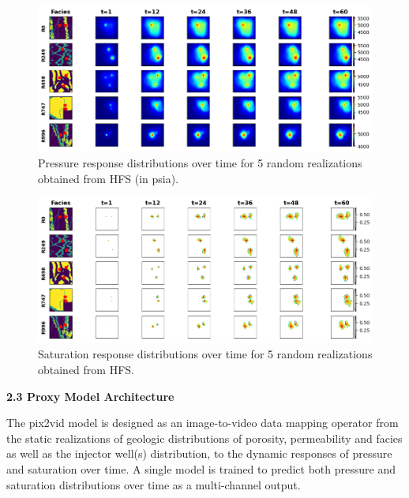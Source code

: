 \documentclass[10pt, twoside]{article}
\begin{document}
\begin{figure}[t]
    \centering
    \includegraphics[width=16cm]{figures/pres_response.png}
    \caption{Pressure response distributions over time for 5 random realizations obtained from HFS (in psia).}
    \label{pres_response}
\end{figure}

\begin{figure}[t]
    \centering
    \includegraphics[width=16cm]{figures/sat_mask_response.png}
    \caption{Saturation response distributions over time for 5 random realizations obtained from HFS.}
    \label{sat_response}
\end{figure}

\textbf{2.3 Proxy Model Architecture} 

The pix2vid model is designed as an image-to-video data mapping operator from the static realizations of geologic distributions of porosity, permeability and facies as well as the injector well(s) distribution, to the dynamic responses of pressure and saturation over time. A single model is trained to predict both pressure and saturation distributions over time as a multi-channel output.  
\end{document}
